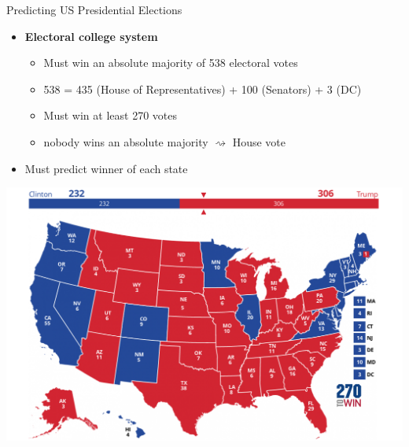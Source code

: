 \documentclass[
  ignorenonframetext,
]{beamer}
\providecommand{\tightlist}{%
  \setlength{\itemsep}{0pt}\setlength{\parskip}{0pt}}
\begin{document}
\begin{frame}{Predicting US Presidential Elections}
\label{predicting-us-presidential-elections}
\pause

\begin{itemize}
\tightlist
\item
  \textbf{Electoral college system} \pause

  \begin{itemize}
  \tightlist
  \item
    Must win an absolute majority of 538 electoral votes \pause
  \item
    538 = 435 (House of Representatives) + 100 (Senators) + 3 (DC)
    \pause
  \item
    Must win at least 270 votes \pause
  \item
    nobody wins an absolute majority \(\rightsquigarrow\) House vote
    \pause
  \end{itemize}
\item
  Must predict winner of each state \pause
\end{itemize}

\begin{center}
  \includegraphics[width=.6\textwidth]{figs/2016electcol.png}
  \end{center}
\end{frame}
\end{document}
